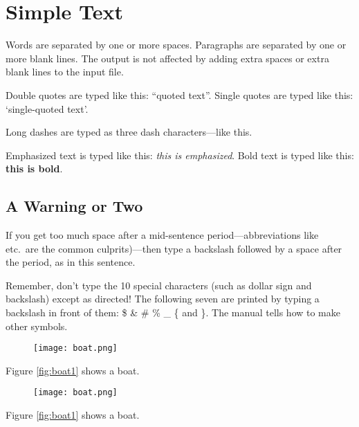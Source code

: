 \documentclass{article}        %
\begin{document}


\section{Simple Text}          %

Words are separated by one or more spaces.  Paragraphs are separated by
one or more blank lines.  The output is not affected by adding extra
spaces or extra blank lines to the input file.

Double quotes are typed like this: ``quoted text''.
Single quotes are typed like this: `single-quoted text'.

Long dashes are typed as three dash characters---like this.

Emphasized text is typed like this: \emph{this is emphasized}.
Bold       text is typed like this: \textbf{this is bold}.

\subsection{A Warning or Two}  %

If you get too much space after a mid-sentence period---abbreviations
like etc.\ are the common culprits)---then type a backslash followed by
a space after the period, as in this sentence.

Remember, don't type the 10 special characters (such as dollar sign and
backslash) except as directed!  The following seven are printed by
typing a backslash in front of them:  \$  \&  \#  \%  \_  \{  and  \}.  
The manual tells how to make other symbols.


\begin{figure}
  \texttt{[image: boat.png]}
\end{figure}
Figure \ref{fig:boat1} shows a boat.

\begin{figure}
  \texttt{[image: boat.png]}
\end{figure}
Figure \ref{fig:boat1} shows a boat.
\end{document}
